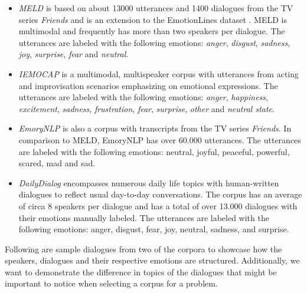 \documentclass[nofilelist]{cslthse-msc}
\begin{document}

\begin{itemize}
    \item \textit{MELD} \citep{poria2019meld} is based on about 13000 utterances and 1400 dialogues from the TV series \textit{Friends} and is an extension to the EmotionLines dataset \citep{chen2018emotionlines}. MELD is multimodal and  frequently has more than two speakers per dialogue. The utterances are labeled with the following emotions: \textit{anger}, \textit{disgust}, \textit{sadness}, \textit{joy}, \textit{surprise}, \textit{fear} and \textit{neutral}.

    \item \textit{IEMOCAP} \citep{busso2008iemocap} is a multimodal, multispeaker corpus with utterances from acting and improvisation scenarios emphasizing on emotional expressions. The utterances are labeled with the following emotions: \textit{anger}, \textit{happiness}, \textit{excitement}, \textit{sadness}, \textit{frustration}, \textit{fear}, \textit{surprise}, \textit{other} and \textit{neutral state}.
    
    \item \textit{EmoryNLP} \citep{zahiri2017emoryNLP} is also a corpus with transcripts from the TV series \textit{Friends}. In comparison to MELD, EmoryNLP has over 60.000 utterances. The utterances are labeled with the following emotions: neutral, joyful, peaceful, powerful, scared, mad and sad.
    
    \item \textit{DailyDialog} \citep{lietal2017dailydialog} encompasses numerous daily life topics with human-written dialogues to reflect usual day-to-day conversations. The corpus has an average of circa 8 speakers per dialogue and has a total of over 13.000 dialogues with their emotions manually labeled. The utterances are labeled with the following emotions: anger, disgust, fear, joy, neutral, sadness, and surprise.
\end{itemize}


Following are sample dialogues from two of the corpora to showcase how the speakers, dialogues and their respective emotions are structured. Additionally, we want to demonstrate the difference in topics of the dialogues that might be important to notice when selecting a corpus for a problem. 
\end{document}
